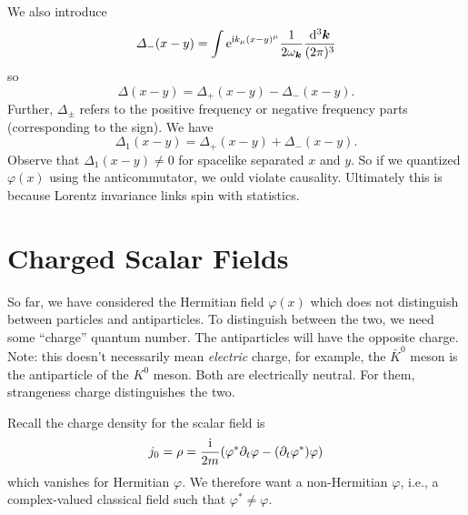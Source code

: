 We also introduce 
\begin{equation}
\Delta_{-}(x-y)=\int\E^{\I k_{\mu}(x-y)^{\mu}}\frac{1}{2\omega_{\vec{k}}}\frac{\D^{3}\vec{k}}{(2\pi)^{3}}
\end{equation}
so
\begin{equation}
\Delta(x-y) = \Delta_{+}(x-y)-\Delta_{-}(x-y).
\end{equation}
Further, $\Delta_{\pm}$ refers to the positive frequency or negative
frequency parts (corresponding to the sign). We have
\begin{equation}
\Delta_{1}(x-y)=\Delta_{+}(x-y)+\Delta_{-}(x-y).
\end{equation}
Observe that $\Delta_{1}(x-y)\neq0$ for spacelike separated $x$ and
$y$. So if we quantized $\varphi(x)$ using the anticommutator, we ould
violate causality. Ultimately this is because Lorentz invariance links
spin with statistics.

\section{Charged Scalar Fields}

So far, we have considered the Hermitian field $\varphi(x)$ which does
not distinguish between particles and antiparticles. To distinguish
between the two, we need some ``charge'' quantum number. The
antiparticles will have the opposite charge. Note: this doesn't
necessarily mean \emph{electric} charge, for example, the $\bar{K}^{0}$
meson is the antiparticle of the $K^{0}$ meson. Both are electrically
neutral. For them, strangeness charge distinguishes the two.

Recall  the charge density for the scalar
field is
\begin{equation}
j_{0} = \rho
= \frac{\mathrm{i}}{2m}(\varphi^{*}\partial_{t}\varphi-(\partial_{t}\varphi^{*})\varphi)
\end{equation}
which vanishes for Hermitian $\varphi$.  We therefore want a
non-Hermitian $\varphi$, i.e., a complex-valued classical field such
that $\varphi^{*}\neq\varphi$.

